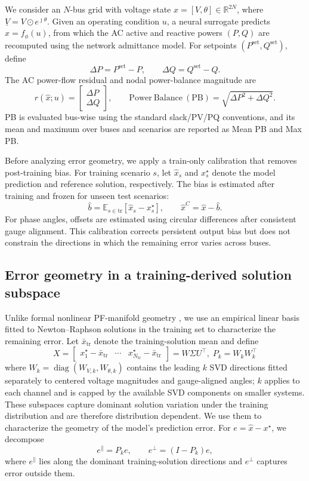 \documentclass{article}
\begin{document}
We consider an $N$-bus grid with voltage state
$x=[V,\theta]\in\mathbb{R}^{2N}$, where
$\underline V=V\odot e^{\jmath\theta}$.
Given an operating condition $u$, a neural surrogate predicts
$\hat{x}=f_\phi(u)$, from which the AC active and reactive powers
$(P,Q)$ are recomputed using the network admittance model.
For setpoints $(P^{\mathrm{set}},Q^{\mathrm{set}})$, define
\[
\Delta P=P^{\mathrm{set}}-P,
\qquad
\Delta Q=Q^{\mathrm{set}}-Q.
\]
The AC power-flow residual and nodal power-balance magnitude are
\[
r(\hat{x};u)=
\begin{bmatrix}
\Delta P\\
\Delta Q
\end{bmatrix},
\qquad
\mathrm{Power~Balance~(PB)}
=
\sqrt{\Delta P^2+\Delta Q^2}.
\]
PB is evaluated bus-wise using the standard slack/PV/PQ conventions,
and its mean and maximum over buses and scenarios are reported as
Mean PB and Max PB.

Before analyzing error geometry, we apply a train-only calibration that removes
post-training bias.
For training scenario $s$, let $\hat{x}_s$ and $x_s^\star$ denote the model
prediction and reference solution, respectively.
The bias is estimated after training and frozen for unseen test scenarios:
\[
    \hat b
    =
    \mathbb{E}_{s\in\mathrm{tr}}
    \left[\hat x_s-x^\star_s\right],
    \qquad
    \hat x^C=\hat x-\hat b.
\]
For phase angles, offsets are estimated using circular differences after
consistent gauge alignment.
This calibration corrects persistent output bias but does not constrain the
directions in which the remaining error varies across buses.

\subsection{Error geometry in a training-derived solution subspace}
Unlike formal nonlinear PF-manifold geometry \cite{goodwin2026geometry}, we
use an empirical linear basis fitted to Newton--Raphson solutions in the
training set to characterize the remaining error.
Let $\bar x_{\mathrm{tr}}$ denote the training-solution mean and define
\begin{equation}
X=
\begin{bmatrix}
x_1^\star-\bar x_{\mathrm{tr}} & \cdots &
x_{N_{\mathrm{tr}}}^\star-\bar x_{\mathrm{tr}}
\end{bmatrix}
=
W\Sigma U^\top,\;
P_k=W_kW_k^\top
\end{equation}
where $W_k=\operatorname{diag}(W_{V,k},W_{\theta,k})$ contains the leading
$k$ SVD directions fitted separately to centered voltage magnitudes and
gauge-aligned angles; $k$ applies to each channel and is capped by the
available SVD components on smaller systems.
These subspaces capture dominant solution variation under the training
distribution and are therefore distribution dependent.
We use them to characterize the geometry of the model's prediction error.
For $e=\hat x-x^\star$, we decompose
\begin{equation}
    e^{\parallel}=P_k e,
    \qquad
    e^{\perp}=(I-P_k)e ,
    \label{eq:error_decomposition}
\end{equation}
where $e^{\parallel}$ lies along the dominant training-solution directions
and $e^{\perp}$ captures error outside them.
\end{document}
